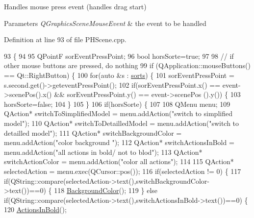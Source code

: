 Handles mouse press event (handles drag start) 


\begin{DoxyParams}{Parameters}
{\em Q\+Graphics\+Scene\+Mouse\+Event} & the event to be handled \\
\hline
\end{DoxyParams}


Definition at line 93 of file P\+H\+Scene.\+cpp.


\begin{DoxyCode}
93                                                                     \{
94 
95     QPointF sorEventPressPoint;
96     \textcolor{keywordtype}{bool} horsSorte=\textcolor{keyword}{true};
97 
98     \textcolor{comment}{// if other mouse buttons are pressed, do nothing}
99     \textcolor{keywordflow}{if} (QApplication::mouseButtons() == Qt::RightButton) \{
100         \textcolor{keywordflow}{for}(\textcolor{keyword}{auto} &s : \hyperlink{classPHScene_a664d48bb0ae4f95df04e7a939855cae5}{sorts}) \{
101             sorEventPressPoint = s.second.get()->geteventPressPoint();
102             \textcolor{keywordflow}{if}(sorEventPressPoint.x() == \textcolor{keyword}{event}->scenePos().x() && sorEventPressPoint.y() == \textcolor{keyword}{event}->scenePos
      ().y()) \{
103                 horsSorte=\textcolor{keyword}{false};
104             \}
105         \}
106         \textcolor{keywordflow}{if}(horsSorte) \{
107 
108             QMenu menu;
109             QAction* switchToSimplifiedModel = menu.addAction(\textcolor{stringliteral}{"switch to simplified model"});
110             QAction* switchToDetailledModel = menu.addAction(\textcolor{stringliteral}{"switch to detailled model"});
111             QAction* switchBackgroundColor = menu.addAction(\textcolor{stringliteral}{"color background "});
112             QAction* switchActionsInBold = menu.addAction(\textcolor{stringliteral}{"all actions in bold/ not to blod"});
113             QAction* switchActionColor = menu.addAction(\textcolor{stringliteral}{"color all actions"});
114 
115             QAction* selectedAction = menu.exec(QCursor::pos());
116             \textcolor{keywordflow}{if}(selectedAction != 0) \{
117                 \textcolor{keywordflow}{if}(QString::compare(selectedAction->text(),switchBackgroundColor->text())==0) \{
118                     \hyperlink{classPHScene_a865f5d4e8e1a62ea4cccc9a08761f3b7}{BackgroundColor}();
119                 \} \textcolor{keywordflow}{else} \textcolor{keywordflow}{if}(QString::compare(selectedAction->text(),switchActionsInBold->text())==0) \{
120                     \hyperlink{classPHScene_ae49485e4ddf79c5d71aba4a4aebf147d}{ActionsInBold}();

\end{DoxyCode}
